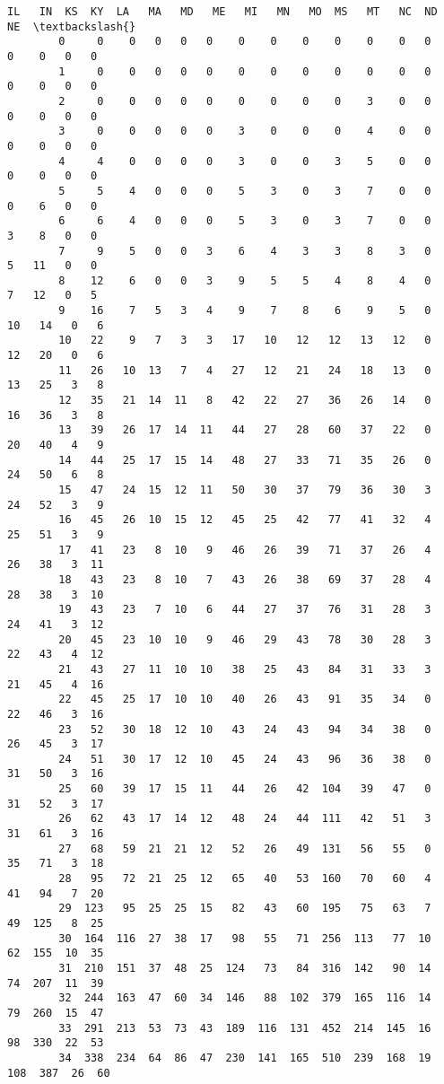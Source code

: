 \documentclass[11pt]{article}
\begin{document}
\begin{Verbatim}[commandchars=\\\{\}]
             IL   IN  KS  KY  LA   MA   MD   ME   MI   MN   MO  MS   MT   NC  ND  NE  \textbackslash{}
        0     0    0   0   0   0    0    0    0    0    0    0   0    0    0   0   0   
        1     0    0   0   0   0    0    0    0    0    0    0   0    0    0   0   0   
        2     0    0   0   0   0    0    0    0    0    3    0   0    0    0   0   0   
        3     0    0   0   0   0    3    0    0    0    4    0   0    0    0   0   0   
        4     4    0   0   0   0    3    0    0    3    5    0   0    0    0   0   0   
        5     5    4   0   0   0    5    3    0    3    7    0   0    0    6   0   0   
        6     6    4   0   0   0    5    3    0    3    7    0   0    3    8   0   0   
        7     9    5   0   0   3    6    4    3    3    8    3   0    5   11   0   0   
        8    12    6   0   0   3    9    5    5    4    8    4   0    7   12   0   5   
        9    16    7   5   3   4    9    7    8    6    9    5   0   10   14   0   6   
        10   22    9   7   3   3   17   10   12   12   13   12   0   12   20   0   6   
        11   26   10  13   7   4   27   12   21   24   18   13   0   13   25   3   8   
        12   35   21  14  11   8   42   22   27   36   26   14   0   16   36   3   8   
        13   39   26  17  14  11   44   27   28   60   37   22   0   20   40   4   9   
        14   44   25  17  15  14   48   27   33   71   35   26   0   24   50   6   8   
        15   47   24  15  12  11   50   30   37   79   36   30   3   24   52   3   9   
        16   45   26  10  15  12   45   25   42   77   41   32   4   25   51   3   9   
        17   41   23   8  10   9   46   26   39   71   37   26   4   26   38   3  11   
        18   43   23   8  10   7   43   26   38   69   37   28   4   28   38   3  10   
        19   43   23   7  10   6   44   27   37   76   31   28   3   24   41   3  12   
        20   45   23  10  10   9   46   29   43   78   30   28   3   22   43   4  12   
        21   43   27  11  10  10   38   25   43   84   31   33   3   21   45   4  16   
        22   45   25  17  10  10   40   26   43   91   35   34   0   22   46   3  16   
        23   52   30  18  12  10   43   24   43   94   34   38   0   26   45   3  17   
        24   51   30  17  12  10   45   24   43   96   36   38   0   31   50   3  16   
        25   60   39  17  15  11   44   26   42  104   39   47   0   31   52   3  17   
        26   62   43  17  14  12   48   24   44  111   42   51   3   31   61   3  16   
        27   68   59  21  21  12   52   26   49  131   56   55   0   35   71   3  18   
        28   95   72  21  25  12   65   40   53  160   70   60   4   41   94   7  20   
        29  123   95  25  25  15   82   43   60  195   75   63   7   49  125   8  25   
        30  164  116  27  38  17   98   55   71  256  113   77  10   62  155  10  35   
        31  210  151  37  48  25  124   73   84  316  142   90  14   74  207  11  39   
        32  244  163  47  60  34  146   88  102  379  165  116  14   79  260  15  47   
        33  291  213  53  73  43  189  116  131  452  214  145  16   98  330  22  53   
        34  338  234  64  86  47  230  141  165  510  239  168  19  108  387  26  60   
        

\end{Verbatim}
\end{document}

